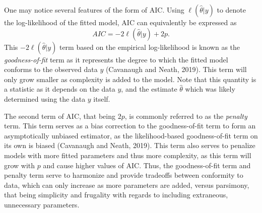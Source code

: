 		One may notice several features of the form of AIC. Using $\ell(\hat{\theta}|y)$ to denote the log-likelihood of the fitted model, AIC can equivalently be expressed as
		\begin{equation*}
			AIC = -2 \ell(\hat{\theta}|y) + 2 p.
		\end{equation*}
		This $-2 \ell(\hat{\theta}|y)$ term based on the empirical log-likelihood is known as the \textit{goodness-of-fit} term as it represents the degree to which the fitted model
		conforms to the observed data $y$ (Cavanaugh and Neath, 2019). This term will only grow smaller as complexity is added to the model. Note that this quantity is
		a statistic as it depends on the data $y$, and the estimate $\hat{\theta}$ which was likely determined using the data $y$ itself.

		The second term of AIC, that being $2 p$, is commonly referred to as the \textit{penalty} term. This term serves as a bias correction to the goodness-of-fit term to form an asymptotically
		unbiased estimator, as the likelihood-based goodness-of-fit term on its own is biased (Cavanaugh and Neath, 2019). This term also serves to penalize models with more fitted parameters and
		thus more complexity, as this term will grow with $p$ and cause higher values of AIC. Thus, the goodness-of-fit term and penalty term serve to harmonize and provide tradeoffs between
		conformity to data, which can only increase as more parameters are added, versus parsimony, that being simplicity and frugality with regards to including extraneous, unnecessary
		parameters.

